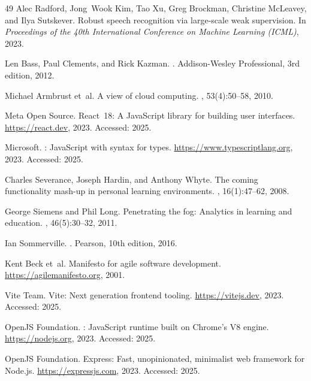 \begin{thebibliography}{49}
Alec Radford, Jong~Wook Kim, Tao Xu, Greg Brockman, Christine McLeavey, and Ilya Sutskever.
\newblock Robust speech recognition via large-scale weak supervision.
\newblock In {\em Proceedings of the 40th International Conference on Machine Learning ({ICML})}, 2023.

Len Bass, Paul Clements, and Rick Kazman.
.
\newblock Addison-Wesley Professional, 3rd edition, 2012.

Michael Armbrust et~al.
\newblock A view of cloud computing.
, 53(4):50--58, 2010.

{Meta Open Source}.
\newblock React~18: A {JavaScript} library for building user interfaces.
\newblock \url{https://react.dev}, 2023.
\newblock Accessed: 2025.

{Microsoft}.
: {JavaScript} with syntax for types.
\newblock \url{https://www.typescriptlang.org}, 2023.
\newblock Accessed: 2025.

Charles Severance, Joseph Hardin, and Anthony Whyte.
\newblock The coming functionality mash-up in personal learning environments.
, 16(1):47--62, 2008.

George Siemens and Phil Long.
\newblock Penetrating the fog: Analytics in learning and education.
, 46(5):30--32, 2011.

Ian Sommerville.
.
\newblock Pearson, 10th edition, 2016.

Kent Beck et~al.
\newblock Manifesto for agile software development.
\newblock \url{https://agilemanifesto.org}, 2001.

{Vite Team}.
\newblock Vite: Next generation frontend tooling.
\newblock \url{https://vitejs.dev}, 2023.
\newblock Accessed: 2025.

{OpenJS Foundation}.
: {JavaScript} runtime built on {Chrome's V8} engine.
\newblock \url{https://nodejs.org}, 2023.
\newblock Accessed: 2025.

{OpenJS Foundation}.
\newblock Express: Fast, unopinionated, minimalist web framework for {Node.js}.
\newblock \url{https://expressjs.com}, 2023.
\newblock Accessed: 2025.


\end{thebibliography}
